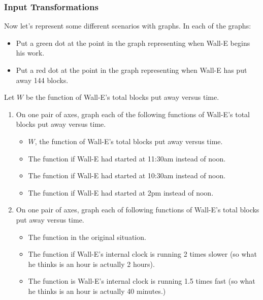 \documentclass[11pt]{article}
\newcommand{\handout}{\subsubsection}
\theoremstyle{definition}
\begin{document}
\vfill

\newpage \handout{Input Transformations}

Now let's represent some different scenarios with graphs. In each of the graphs:
	\begin{itemize}
	\item Put a green dot at the point in the graph representing when Wall-E begins his work. 
	\item Put a red dot at the point in the graph representing when Wall-E has put away 144 blocks. 
 	\end{itemize}
 Let $W$ be the function of Wall-E's total blocks put away versus time. 

\begin{enumerate}
\item On one pair of axes, graph each of the following functions of Wall-E's total blocks put away versus time. 
	\begin{itemize}
	\item $W$, the function of Wall-E's total blocks put away versus time.
	\item The function if Wall-E had started at 11:30am instead of noon. 
	\item The function if Wall-E had started at 10:30am instead of noon.
	\item  The function if Wall-E had started at 2pm instead of noon.
	\end{itemize}
	
\vfill 

\item On one pair of axes, graph each of following functions of Wall-E's total blocks put away versus time.
	\begin{itemize}
	\item The function in the original situation.
	\item The function if Wall-E's internal clock is running 2 times slower (so what he thinks is an hour is actually 2 hours).
	\item The function is Wall-E's internal clock is running 1.5 times fast (so what he thinks is an hour is actually 40 minutes.)
	\end{itemize}
\end{enumerate}


\vfill 
\newpage
\end{document}
